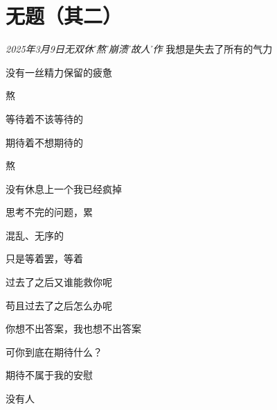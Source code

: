 \section*{无题（其二）}
\begin{center}
\textit{2025年3月9日\hh 无双休\h 硬熬\h 近崩溃\h 待故人\h 故作}\hh
我想是失去了所有的气力

没有一丝精力保留的疲惫

熬

等待着不该等待的

期待着不想期待的

熬

没有休息上一个我已经疯掉

思考不完的问题，累

混乱、无序的

只是等着罢，等着

过去了之后又谁能救你呢

苟且过去了之后怎么办呢

你想不出答案，我也想不出答案

可你到底在期待什么？

期待不属于我的安慰

没有人
\end{center}